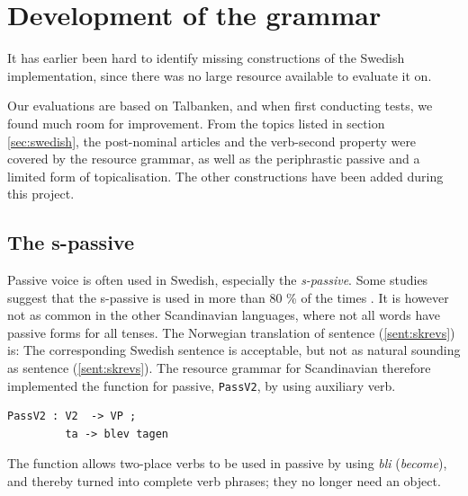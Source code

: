 \documentclass{report}
\begin{document}
\section{Development of the grammar}
\label{sec:Added}
It has earlier been hard to identify missing constructions of the Swedish
implementation, since there was no large resource available to evaluate it on.

Our evaluations are based on Talbanken, and when first conducting tests,
 we found much room for improvement.
From the topics listed in section \ref{sec:swedish}, the post-nominal articles
and the verb-second property
were covered by the resource grammar, as well as the periphrastic passive and
a limited form of topicalisation. 
The other constructions have been added during this project.

\subsection{The s-passive}
Passive voice is often used in Swedish, especially the
\textit{s-passive}.
\label{sent:skrevs}
Some studies suggest that the s-passive is used in more than 80 \% of the times
\cite{laanemets}.
It is however not as common in the other Scandinavian languages, 
where not all words have passive forms for all tenses. The Norwegian 
translation of sentence (\ref{sent:skrevs}) is:
The corresponding Swedish sentence is acceptable, but not as natural sounding as sentence
(\ref{sent:skrevs}).
The resource grammar for Scandinavian therefore implemented the function for passive,
\verb-PassV2-, by using auxiliary verb. \\
\begin{verbatim}
PassV2 : V2  -> VP ;
         ta -> blev tagen
\end{verbatim}
The function allows two-place verbs to be used in passive by using \emph{bli} (\emph{become}), and thereby
turned into complete verb phrases; they no longer need an object.\\
\end{document}

